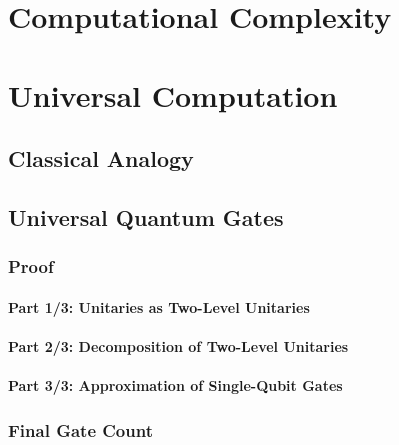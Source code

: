 \chapter{Computational Complexity} %

\chapter{Universal Computation} %

    \section{Classical Analogy} %

    \section{Universal Quantum Gates} %

        \subsection{Proof} %

            \subsubsection{Part 1/3: Unitaries as Two-Level Unitaries} %

            \subsubsection{Part 2/3: Decomposition of Two-Level Unitaries} %

            \subsubsection{Part 3/3: Approximation of Single-Qubit Gates} %

        \subsection{Final Gate Count} %

